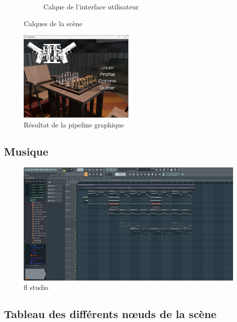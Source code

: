 \begin{figure}[H]
\begin{subfigure}{0.3\textwidth}
            \caption{Calque de l'interface utilisateur}
            \label{fig:graphics_pipeline_gbuffer_gui}
        \end{subfigure}
        \caption{Calques de la scène}
        \label{fig:graphics_pipeline_post_processing}
    \end{figure}
    \begin{figure}[H]
        \centering
        \includegraphics[width=0.5\textwidth]{images/raptiquax_rendering_result.png}
        \caption{Résultat de la pipeline graphique}
        \label{fig:graphics_pipeline_result}
    \end{figure}
\subsection{Musique}
\begin{figure}[H]
    \centering
    \includegraphics[width=1\linewidth]{images/flstudio.png}
    \caption{fl studio}
    \label{fig:flstudio.png}
\end{figure}

\newpage
\subsection{Tableau des différents n\oe{}uds de la scène}
    \renewcommand{\arraystretch}{1.2}
    \setlength{\tabcolsep}{10pt}

